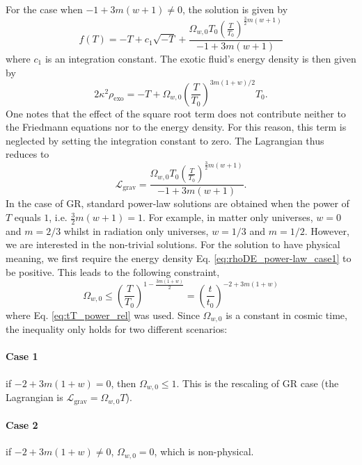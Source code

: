 \documentclass[prl,floatfix,showpacs,twocolumn,preprintnumbers,amsmath,amssymb,superscriptaddress]{revtex4}
\begin{document}
For the case when $-1+3 m (w+1) \neq 0$, the solution is given by
\begin{equation}
f(T) = -T+c_1 \sqrt{-T}+\dfrac{\Omega_{w,0} T_0 \left(\frac{T}{T_0}\right)^{\frac{3}{2} m (w+1)}}{-1+3 m (w+1)}
\end{equation}
where $c_1$ is an integration constant. The exotic fluid's energy density is then given by
\begin{equation}\label{eq:rhoDE_power-law_case1}
2\kappa^2 \rho_{\text{exo}} = -T + \Omega_{w,0}\left(\frac{T}{T_0}\right)^{3m (1 + w)/2} T_0.
\end{equation}
One notes that the effect of the square root term does not contribute neither to the Friedmann equations nor to the energy density. For this reason, this term is neglected by setting the integration constant to zero. The Lagrangian thus reduces to
\begin{equation}
\mathcal{L}_{\text{grav}} = \dfrac{\Omega_{w,0} T_0 \left(\frac{T}{T_0}\right)^{\frac{3}{2} m (w+1)}}{-1+3 m (w+1)}.
\end{equation}
In the case of GR, standard power-law solutions are obtained when the power of $T$ equals $1$, i.e. $\frac{3}{2} m (w+1) = 1$. For example, in matter only universes, $w = 0$ and $m = 2/3$ whilst in radiation only universes, $w = 1/3$ and $m = 1/2$. However, we are interested in the non-trivial solutions. For the solution to have physical meaning, we first require the energy density Eq. \eqref{eq:rhoDE_power-law_case1} to be positive.  This leads to the following constraint,
\begin{equation}
\Omega_{w,0} \leq \left(\frac{T}{T_0}\right)^{1-\frac{3m (1 + w)}{2}} = \left(\frac{t}{t_0}\right)^{-2+3m (1 + w)}
\end{equation}
where Eq. \eqref{eq:tT_power_rel} was used. Since $\Omega_{w,0}$ is a constant in cosmic time, the inequality only holds for two different scenarios: 

\paragraph{Case 1} if $-2+3m (1 + w) = 0$, then $\Omega_{w,0} \leq 1$. This is the rescaling of GR case (the Lagrangian is $\mathcal{L}_{\text{grav}} = \Omega_{w,0} T$).
\paragraph{Case 2} if $-2+3m (1 + w) \neq 0$, $\Omega_{w,0} = 0$, which is non-physical.
\end{document}
